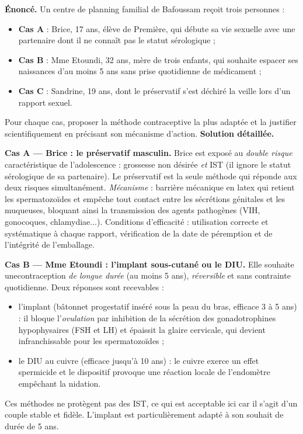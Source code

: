 \documentclass[11pt]{article}
\newcommand{\cle}[1]{{\popxbold\color{popdark}#1}}
\begin{document}
\begin{exoresolu}
\textbf{Énoncé.} Un centre de planning familial de Bafoussam reçoit trois personnes :
\begin{itemize}
\item \textbf{Cas A} : Brice, 17 ans, élève de Première, qui débute sa vie sexuelle avec une partenaire dont il ne connaît pas le statut sérologique ;
\item \textbf{Cas B} : Mme Etoundi, 32 ans, mère de trois enfants, qui souhaite espacer ses naissances d'au moins 5 ans sans prise quotidienne de médicament ;
\item \textbf{Cas C} : Sandrine, 19 ans, dont le préservatif s'est déchiré la veille lors d'un rapport sexuel.
\end{itemize}
Pour chaque cas, proposer la méthode contraceptive la plus adaptée et la justifier scientifiquement en précisant son mécanisme d'action.
\tcblower
\textbf{Solution détaillée.}

\textbf{Cas A — Brice : le préservatif masculin.} Brice est exposé au \emph{double risque} caractéristique de l'adolescence : grossesse non désirée \emph{et} IST (il ignore le statut sérologique de sa partenaire). Le \cle{préservatif} est la seule méthode qui réponde aux deux risques simultanément. \emph{Mécanisme} : barrière mécanique en latex qui retient les spermatozoïdes et empêche tout contact entre les sécrétions génitales et les muqueuses, bloquant ainsi la transmission des agents pathogènes (VIH, gonocoques, chlamydiae...). Conditions d'efficacité : utilisation correcte et systématique à chaque rapport, vérification de la date de péremption et de l'intégrité de l'emballage.

\textbf{Cas B — Mme Etoundi : l'implant sous-cutané ou le DIU.} Elle souhaite unecontraception \emph{de longue durée} (au moins 5 ans), \emph{réversible} et sans contrainte quotidienne. Deux réponses sont recevables :
\begin{itemize}
\item l'\cle{implant} (bâtonnet progestatif inséré sous la peau du bras, efficace 3 à 5 ans) : il bloque l'\emph{ovulation} par inhibition de la sécrétion des gonadotrophines hypophysaires (FSH et LH) et épaissit la glaire cervicale, qui devient infranchissable pour les spermatozoïdes ;
\item le \cle{DIU au cuivre} (efficace jusqu'à 10 ans) : le cuivre exerce un effet spermicide et le dispositif provoque une réaction locale de l'endomètre empêchant la nidation.
\end{itemize}
Ces méthodes ne protègent pas des IST, ce qui est acceptable ici car il s'agit d'un couple stable et fidèle. L'implant est particulièrement adapté à son souhait de durée de 5 ans.


\end{exoresolu}
\end{document}
